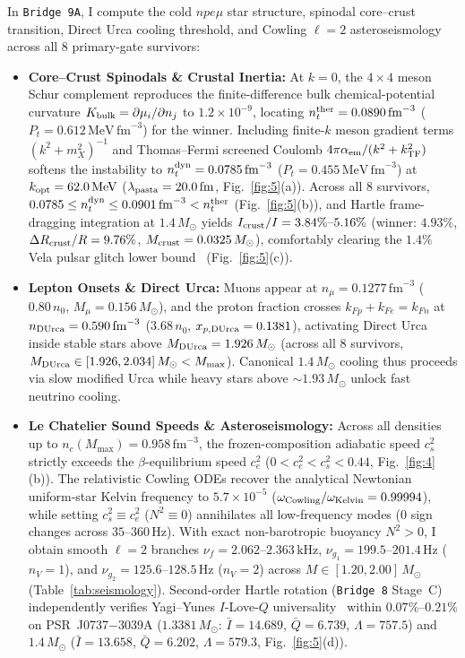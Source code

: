 \documentclass[aps,prc,twocolumn,superscriptaddress,nofootinbib,floatfix]{revtex4-2}
\begin{document}
In \texttt{Bridge 9A}, I compute the cold $npe\mu$ star structure, spinodal core--crust transition, Direct Urca cooling threshold, and Cowling $\ell=2$ asteroseismology across all 8 primary-gate survivors:
\begin{itemize}
\item \textbf{Core--Crust Spinodals \& Crustal Inertia:} At $k=0$, the $4\times 4$ meson Schur complement reproduces the finite-difference bulk chemical-potential curvature $K_{\rm bulk} = \partial\mu_i/\partial n_j$ to $1.2\times 10^{-9}$, locating $n_t^{\rm ther} = 0.0890\,\mathrm{fm}^{-3}$ ($P_t = 0.612\,\mathrm{MeV}\,\mathrm{fm}^{-3}$) for the winner. Including finite-$k$ meson gradient terms $(k^2 + m_X^2)^{-1}$ and Thomas--Fermi screened Coulomb $4\pi\alpha_{\rm em}/(k^2 + k_{\rm TF}^2)$ softens the instability to $n_t^{\rm dyn} = 0.0785\,\mathrm{fm}^{-3}$ ($P_t = 0.455\,\mathrm{MeV}\,\mathrm{fm}^{-3}$) at $k_{\rm opt} = 62.0\,\mathrm{MeV}$ ($\lambda_{\rm pasta} = 20.0\,\mathrm{fm}$, Fig.~\ref{fig:5}(a)). Across all 8 survivors, $0.0785 \le n_t^{\rm dyn} \le 0.0901\,\mathrm{fm}^{-3} < n_t^{\rm ther}$ (Fig.~\ref{fig:5}(b)), and Hartle frame-dragging integration at $1.4\,M_\odot$ yields $I_{\rm crust}/I = 3.84\%\text{--}5.16\%$ (winner: $4.93\%$, $\Delta R_{\rm crust}/R = 9.76\%$, $M_{\rm crust} = 0.0325\,M_\odot$), comfortably clearing the $1.4\%$ Vela pulsar glitch lower bound~\cite{Link1999} (Fig.~\ref{fig:5}(c)).
\item \textbf{Lepton Onsets \& Direct Urca:} Muons appear at $n_\mu = 0.1277\,\mathrm{fm}^{-3}$ ($0.80\,n_0$, $M_\mu = 0.156\,M_\odot$), and the proton fraction crosses $k_{Fp} + k_{Fe} = k_{Fn}$ at $n_{\rm DUrca} = 0.590\,\mathrm{fm}^{-3}$ ($3.68\,n_0$, $x_{p,\rm DUrca} = 0.1381$), activating Direct Urca inside stable stars above $M_{\rm DUrca} = 1.926\,M_\odot$ (across all 8 survivors, $M_{\rm DUrca} \in [1.926, 2.034]\,M_\odot < M_{\max}$). Canonical $1.4\,M_\odot$ cooling thus proceeds via slow modified Urca while heavy stars above $\sim 1.93\,M_\odot$ unlock fast neutrino cooling.
\item \textbf{Le Chatelier Sound Speeds \& Asteroseismology:} Across all densities up to $n_c(M_{\max}) = 0.958\,\mathrm{fm}^{-3}$, the frozen-composition adiabatic speed $c_s^2$ strictly exceeds the $\beta$-equilibrium speed $c_e^2$ ($0 < c_e^2 < c_s^2 < 0.44$, Fig.~\ref{fig:4}(b)). The relativistic Cowling ODEs recover the analytical Newtonian uniform-star Kelvin frequency to $5.7\times 10^{-5}$ ($\omega_{\rm Cowling}/\omega_{\rm Kelvin} = 0.99994$), while setting $c_s^2 \equiv c_e^2$ ($N^2 \equiv 0$) annihilates all low-frequency modes ($0$ sign changes across $35\text{--}360\,\mathrm{Hz}$). With exact non-barotropic buoyancy $N^2 > 0$, I obtain smooth $\ell=2$ branches $\nu_f = 2.062\text{--}2.363\,\mathrm{kHz}$, $\nu_{g_1} = 199.5\text{--}201.4\,\mathrm{Hz}$ ($n_V=1$), and $\nu_{g_2} = 125.6\text{--}128.5\,\mathrm{Hz}$ ($n_V=2$) across $M \in [1.20, 2.00]\,M_\odot$ (Table~\ref{tab:seismology}). Second-order Hartle rotation (\texttt{Bridge 8} Stage~C) independently verifies Yagi--Yunes $I$-Love-$Q$ universality~\cite{Yagi2017} within $0.07\%\text{--}0.21\%$ on PSR~J0737$-$3039A ($1.3381\,M_\odot$: $\bar{I}=14.689$, $\bar{Q}=6.739$, $\Lambda=757.5$) and $1.4\,M_\odot$ ($\bar{I}=13.658$, $\bar{Q}=6.202$, $\Lambda=579.3$, Fig.~\ref{fig:5}(d)).

\end{itemize}
\end{document}
